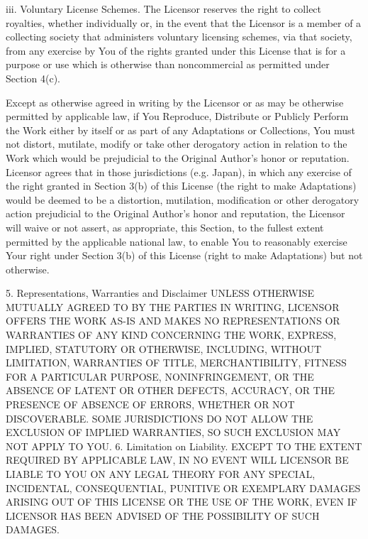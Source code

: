 \documentclass[oneside]{book}
\begin{document}
iii.  Voluntary License Schemes. The Licensor reserves the right to collect
royalties, whether individually or, in the event that the Licensor is a member
of a collecting society that administers voluntary licensing schemes, via that
society, from any exercise by You of the rights granted under this License that
is for a purpose or use which is otherwise than noncommercial as permitted under
Section 4(c).

Except as otherwise agreed in writing by the Licensor or as may be otherwise
permitted by applicable law, if You Reproduce, Distribute or Publicly Perform
the Work either by itself or as part of any Adaptations or Collections, You must
not distort, mutilate, modify or take other derogatory action in relation to the
Work which would be prejudicial to the Original Author's honor or
reputation. Licensor agrees that in those jurisdictions (e.g. Japan), in which
any exercise of the right granted in Section 3(b) of this License (the right to
make Adaptations) would be deemed to be a distortion, mutilation, modification
or other derogatory action prejudicial to the Original Author's honor and
reputation, the Licensor will waive or not assert, as appropriate, this Section,
to the fullest extent permitted by the applicable national law, to enable You to
reasonably exercise Your right under Section 3(b) of this License (right to make
Adaptations) but not otherwise.


5. Representations, Warranties and Disclaimer
UNLESS OTHERWISE MUTUALLY AGREED TO BY THE PARTIES IN WRITING, LICENSOR OFFERS
THE WORK AS-IS AND MAKES NO REPRESENTATIONS OR WARRANTIES OF ANY KIND CONCERNING
THE WORK, EXPRESS, IMPLIED, STATUTORY OR OTHERWISE, INCLUDING, WITHOUT
LIMITATION, WARRANTIES OF TITLE, MERCHANTIBILITY, FITNESS FOR A PARTICULAR
PURPOSE, NONINFRINGEMENT, OR THE ABSENCE OF LATENT OR OTHER DEFECTS, ACCURACY,
OR THE PRESENCE OF ABSENCE OF ERRORS, WHETHER OR NOT DISCOVERABLE. SOME
JURISDICTIONS DO NOT ALLOW THE EXCLUSION OF IMPLIED WARRANTIES, SO SUCH
EXCLUSION MAY NOT APPLY TO YOU.
6. Limitation on Liability.
EXCEPT TO THE EXTENT REQUIRED BY APPLICABLE LAW, IN NO EVENT WILL LICENSOR BE
LIABLE TO YOU ON ANY LEGAL THEORY FOR ANY SPECIAL, INCIDENTAL, CONSEQUENTIAL,
PUNITIVE OR EXEMPLARY DAMAGES ARISING OUT OF THIS LICENSE OR THE USE OF THE
WORK, EVEN IF LICENSOR HAS BEEN ADVISED OF THE POSSIBILITY OF SUCH DAMAGES.
\end{document}
